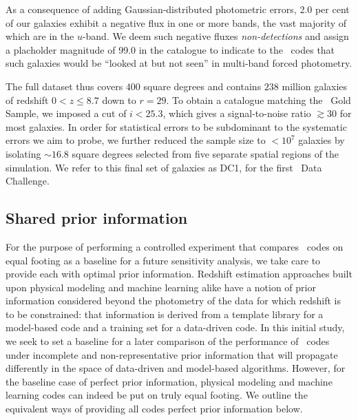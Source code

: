 As a consequence of adding Gaussian-distributed photometric errors, 2.0 per cent of our galaxies exhibit a negative flux in one or more bands, the vast majority of which are in the $u$-band.
We deem such negative fluxes \textit{non-detections} and assign a placholder magnitude of 99.0 in the catalogue to indicate to the \pzpdf\ codes that such galaxies would be ``looked at but not seen'' in multi-band forced photometry.

The full dataset thus covers $400$ square degrees and contains $238$ million galaxies of redshift $0 < z \leq 8.7$ down to $r = 29$.  
To obtain a catalogue matching the \lsst\ Gold Sample, we imposed a cut of $i < 25.3$, which gives a signal-to-noise ratio $\gtrsim 30$ for most galaxies.
In order for statistical errors to be subdominant to the systematic errors we aim to probe, we further reduced the sample size to $<10^{7}$ galaxies by isolating $\sim 16.8$ square degrees selected from five separate spatial regions of the simulation.
We refer to this final set of galaxies as DC1, for the first \lsstdesc\ Data Challenge.

\subsection{Shared prior information}
\label{sec:controlled}

For the purpose of performing a controlled experiment that compares \pzpdf\ codes on equal footing as a baseline for a future sensitivity analysis, we take care to provide each with optimal prior information.
Redshift estimation approaches built upon physical modeling and machine learning alike have a notion of prior information considered beyond the photometry of the data for which redshift is to be constrained: that information is derived from a template library for a model-based code and a training set for a data-driven code.
In this initial study, we seek to set a baseline for a later comparison of the performance of \pzpdf\ codes under incomplete and non-representative prior information that will propagate differently in the space of data-driven and model-based algorithms.
However, for the baseline case of perfect prior information, physical modeling and machine learning codes can indeed be put on truly equal footing.
We outline the equivalent ways of providing all codes perfect prior information below.

